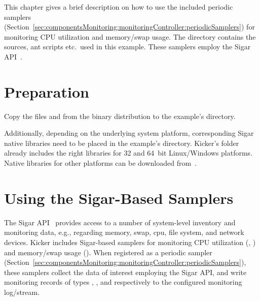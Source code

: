This chapter gives a brief description on how to use the included %
periodic samplers (Section~\ref{sec:componentsMonitoring:monitoringController:periodicSamplers}) %
for monitoring CPU utilization and memory/swap usage. %
The directory \dir{\SigarExampleDirDistro/} contains the %
sources, ant scripts etc.\ used in this example. %
These samplers employ the Sigar API~\cite{HypericSigarWebsite}. \\%

\section{Preparation}

\begin{compactenum}
\item Copy the files \file{\mainJarEMF} and \file{\sigarJar} from the %
binary distribution to the example's  directory.
\item Additionally, depending on the underlying system platform, %
corresponding Sigar native libraries need to be placed in the example's  directory. %
Kicker's  folder already includes the right libraries for 32 and 64~bit Linux/Windows platforms. %
Native libraries for other platforms can be downloaded from~\cite{HypericSigarWebsite}. %
\end{compactenum}

\section{Using the Sigar-Based Samplers}


The Sigar API~\cite{HypericSigarWebsite} provides access to a number of system-level inventory and monitoring data, %
e.g., regarding memory, swap, cpu, file system, and network devices. %
Kicker includes Sigar-based samplers %
for monitoring CPU utilization %
(, ) %
and memory/swap usage (). %
When registered as a periodic sampler (Section~\ref{sec:componentsMonitoring:monitoringController:periodicSamplers}), %
these samplers collect the data of interest employing the Sigar API, %
and write monitoring records of types , %
, and  respectively %
to the configured monitoring log/stream. %

